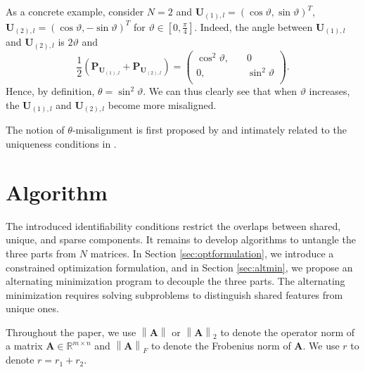\documentclass[twoside,11pt]{article}
\newcommand{\norm}[1]{\left\lVert#1\right\rVert}
\newcommand{\matA}{\mathbf{A}}
\newcommand{\matP}{\mathbf{P}}
\newcommand{\matU}{\mathbf{U}}
\newcommand{\fracud}{\frac{1}{2}}
\begin{document}
As a concrete example, consider $N=2$ and $\matU_{(1),l}=\left( \cos \vartheta, \sin \vartheta\right)^T$, $\matU_{(2),l}=\left( \cos \vartheta, -\sin \vartheta\right)^T$ for $\vartheta\in[0,\frac{\pi}{4}]$. Indeed, the angle between $\matU_{(1),l}$ and $\matU_{(2),l}$ is $2\vartheta$ and
$$
\fracud\left(\matP_{\matU_{(1),l}}+\matP_{\matU_{(2),l}}\right)=\left(\begin{aligned}
\cos^2\vartheta, &\quad 0\\
0, &\quad \sin^2\vartheta\\
\end{aligned}\right).
$$
Hence, by definition, $\theta=\sin^2\vartheta$. We can thus clearly see that when $\vartheta$ increases, the $\matU_{(1),l}$ and $\matU_{(2),l}$ become more misaligned.

The notion of $\theta$-misalignment is first proposed by \citet{personalizedpca} and intimately related to the uniqueness conditions in \citet{jive}. 


\section{Algorithm}
\label{sec:algorithm}
The introduced identifiability conditions restrict the overlaps between shared, unique, and sparse components. It remains to develop algorithms to untangle the three parts from $N$ matrices. In Section \ref{sec:optformulation}, we introduce a constrained optimization formulation, and in Section \ref{sec:altmin}, we propose an alternating minimization program to decouple the three parts. The alternating minimization requires solving subproblems to distinguish shared features from unique ones. %

Throughout the paper, we use $\norm{\matA}$ or $\norm{\matA}_2$ to denote the operator norm of a matrix $\matA\in\mathbb{R}^{m\times n}$ and $\norm{\matA}_F$ to denote the Frobenius norm of $\matA$. We use $r$ to denote $r=r_1+r_2$.
\end{document}
